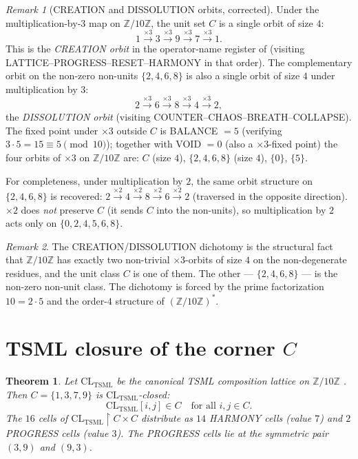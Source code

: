 \documentclass[11pt,reqno]{amsart}
\theoremstyle{plain}
\newtheorem{theorem}{Theorem}[section]
\theoremstyle{definition}
\theoremstyle{remark}
\newtheorem*{remark}{Remark}
\newcommand{\Z}{\mathbb{Z}}
\newcommand{\TSML}{\mathrm{TSML}}
\begin{document}
\begin{remark}[CREATION and DISSOLUTION orbits, corrected]\label{rem:creation}
Under the multiplication-by-$3$ map on $\Z/10\Z$, the unit set $C$ is
a single orbit of size $4$:
\[
1 \xrightarrow{\times 3} 3 \xrightarrow{\times 3} 9
  \xrightarrow{\times 3} 7 \xrightarrow{\times 3} 1.
\]
This is the \emph{CREATION orbit} in the operator-name register of
\cite{SandersForcing} (visiting LATTICE--PROGRESS--RESET--HARMONY in
that order).  The complementary orbit on the non-zero non-units
$\{2, 4, 6, 8\}$ is also a single orbit of size $4$ under
multiplication by $3$:
\[
2 \xrightarrow{\times 3} 6 \xrightarrow{\times 3} 8
  \xrightarrow{\times 3} 4 \xrightarrow{\times 3} 2,
\]
the \emph{DISSOLUTION orbit} (visiting
COUNTER--CHAOS--BREATH--COLLAPSE).
The fixed point under $\times 3$ outside $C$ is BALANCE $= 5$
(verifying $3 \cdot 5 = 15 \equiv 5 \pmod{10}$); together with VOID
$= 0$ (also a $\times 3$-fixed point) the four orbits of $\times 3$ on
$\Z/10\Z$ are: $C$ (size $4$), $\{2,4,6,8\}$ (size $4$), $\{0\}$,
$\{5\}$.

For completeness, under multiplication by $2$, the same orbit
structure on $\{2, 4, 6, 8\}$ is recovered:
$2 \xrightarrow{\times 2} 4 \xrightarrow{\times 2} 8
  \xrightarrow{\times 2} 6 \xrightarrow{\times 2} 2$
(traversed in the opposite direction).  $\times 2$ does \emph{not}
preserve $C$ (it sends $C$ into the non-units), so multiplication by
$2$ acts only on $\{0, 2, 4, 5, 6, 8\}$.
\end{remark}

\begin{remark}
The CREATION/DISSOLUTION dichotomy is the structural fact that
$\Z/10\Z$ has exactly two non-trivial $\times 3$-orbits of size $4$
on the non-degenerate residues, and the unit class $C$ is one of them.
The other --- $\{2, 4, 6, 8\}$ --- is the non-zero non-unit class.
The dichotomy is forced by the prime factorization $10 = 2 \cdot 5$
and the order-$4$ structure of $(\Z/10\Z)^*$.
\end{remark}

\section{TSML closure of the corner $C$}
\label{sec:closure}

\begin{theorem}\label{thm:closure}
Let $\mathrm{CL}_\TSML$ be the canonical TSML composition lattice on
$\Z/10\Z$ \cite{SandersForcing}.  Then $C = \{1, 3, 7, 9\}$ is
$\mathrm{CL}_\TSML$-closed:
\[
\mathrm{CL}_\TSML[i, j] \in C \quad \text{for all } i, j \in C.
\]
The $16$ cells of $\mathrm{CL}_\TSML \restriction C \times C$
distribute as $14$ HARMONY cells (value $7$) and $2$ PROGRESS cells
(value $3$).  The PROGRESS cells lie at the symmetric pair $(3, 9)$
and $(9, 3)$.
\end{theorem}
\end{document}
